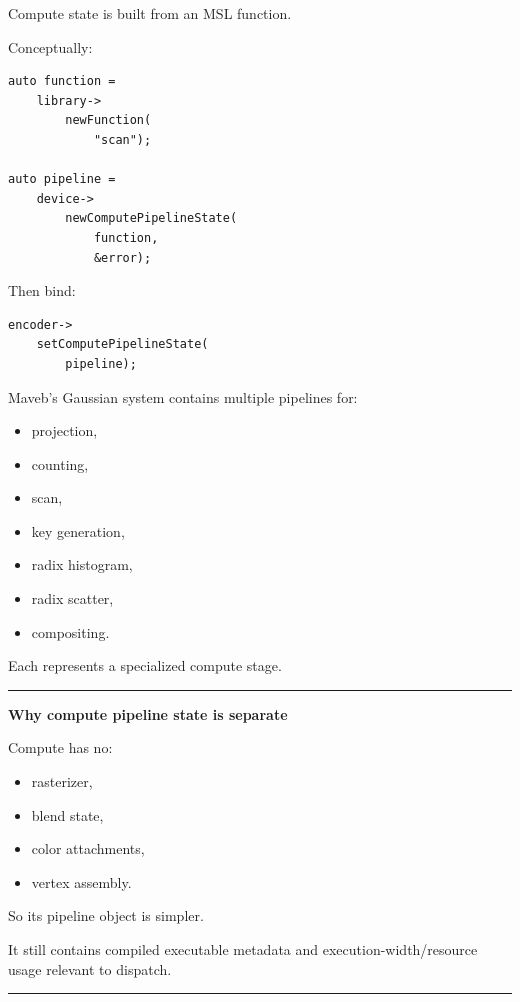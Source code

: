 Compute state is built from an MSL  function.

Conceptually:

\begin{verbatim}
auto function =
    library->
        newFunction(
            "scan");

auto pipeline =
    device->
        newComputePipelineState(
            function,
            &error);
\end{verbatim}

Then bind:

\begin{verbatim}
encoder->
    setComputePipelineState(
        pipeline);
\end{verbatim}

Maveb's Gaussian system contains multiple pipelines for:

\begin{itemize}
\tightlist
\item
  projection,
\item
  counting,
\item
  scan,
\item
  key generation,
\item
  radix histogram,
\item
  radix scatter,
\item
  compositing.
\end{itemize}

Each represents a specialized compute stage.

\begin{center}\rule{0.5\linewidth}{0.5pt}\end{center}

\textbf{Why compute pipeline state is separate}

Compute has no:

\begin{itemize}
\tightlist
\item
  rasterizer,
\item
  blend state,
\item
  color attachments,
\item
  vertex assembly.
\end{itemize}

So its pipeline object is simpler.

It still contains compiled executable metadata and execution-width/resource usage relevant to dispatch.

\begin{center}\rule{0.5\linewidth}{0.5pt}\end{center}

